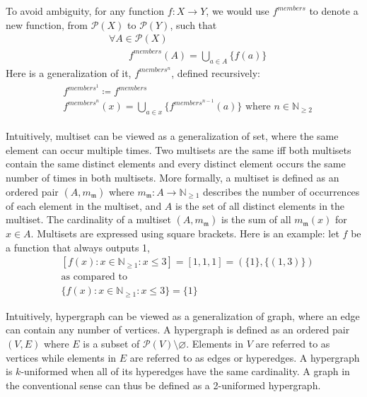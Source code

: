 \documentclass[11pt, oneside]{article}      %
\theoremstyle{definition}
\numberwithin{equation}{section}
\theoremstyle{c}
\begin{document}
To avoid ambiguity, for any function $f : X \longrightarrow Y$, we would use $f^{members}$ to denote a new function, from $\mathcal{P}(X)$ to $\mathcal{P}(Y)$, such that
\begin{align*}
&\forall A \in \mathcal{P}(X) \\
&\qquad f^{members}(A) = \bigcup_{a \in A} \{ f(a)\}
\end{align*}
Here is a generalization of it, $f^{members^n}$, defined recursively:
\begin{gather*}
\begin{split}
&f^{members^1} \coloneqq f^{members} \\
&f^{members^n}(x) = \bigcup_{a \in x} \{ f^{members^{n-1}}(a)  \}  \text{ where } n \in \mathbb{N}_{\geq 2}
\end{split}
\end{gather*}

Intuitively, multiset can be viewed as a generalization of set, where the same element can occur multiple times. Two multisets are the same iff both multisets contain the same distinct elements and every distinct element occurs the same number of times in both multisets. More formally, a multiset is defined as an ordered pair $(A,m_{\mathfrak{m}})$ where $m_{\mathfrak{m}} : A \longrightarrow \mathbb{N}_{\geq 1}$ describes the number of occurrences of each element in the multiset, and $A$ is the set of all distinct elements in the multiset. The cardinality of a multiset $(A,m_{\mathfrak{m}})$ is the sum of all $m_{\mathfrak{m}}(x)$ for $x \in A$. Multisets are expressed using square brackets. Here is an example: let $f$ be a function that always outputs 1,
\begin{align*}
&[f(x) : x \in \mathbb{N}_{\geq 1} : x \leq 3] = [1,1,1] = (\{1\},\{(1,3)\}) \\
&\text{as compared to} \\
&\{f(x) : x \in \mathbb{N}_{\geq 1} : x \leq 3\} = \{1\}
\end{align*}

Intuitively, hypergraph can be viewed as a generalization of graph, where an edge can contain any number of vertices. A hypergraph is defined as an ordered pair $(V,E)$ where $E$ is a subset of $\mathcal{P}(V) \setminus \varnothing$. Elements in $V$ are referred to as vertices while elements in $E$ are referred to as edges or hyperedges. A hypergraph is $k$-uniformed when all of its hyperedges have the same cardinality. A graph in the conventional sense can thus be defined as a 2-uniformed hypergraph.
\end{document}
